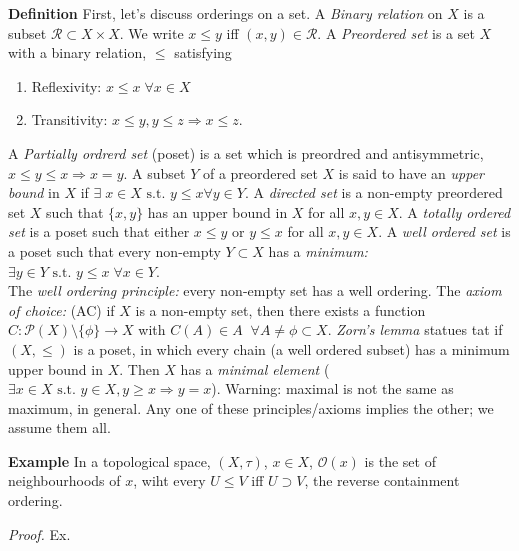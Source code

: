 \documentclass[12pt]{article}
\newcommand{\pset}[1]{ \mathcal{P}(#1) }
\newcommand{\st}[0]{ \textrm{ s.t. } }
\newcommand{\rimply}[0] { \Rightarrow }
\newcommand{\rarw}[0] { \rightarrow }
\newcommand{\curlyO}[0] { \mathcal{O} }
\newcommand{\R}[0] { \mathcal{R} }
\begin{document}
\begin{flushleft} 
  { \bf Definition } First, let's discuss orderings on a set. A \emph{Binary relation} on $X$ is a subset $\R \subset X \times X$. We write $x \le y$ iff $(x,y) \in \R$. A \emph{Preordered set} is a set $X$ with a binary relation, $\le$ satisfying\begin{enumerate}[i]
\item
  Reflexivity: $x \le x \; \forall x \in X$\
\item
  Transitivity: $x \le y, y \le z \rimply x \le z$.
\end{enumerate}
A \emph{Partially ordrerd set} (poset) is a set which is preordred and antisymmetric, $x \le y \le x \rimply x=y$.
A subset $Y$ of a preordered set $X$ is said to have an \emph{upper bound} in $X$ if $\exists \; x \in X \st y \le x \forall y \in Y$.
A \emph{directed set} is a non-empty preordered set $X$ such that $\{x,y\}$ has an upper bound in $X$ for all $x,y \in X$.
A \emph{totally ordered set} is a poset such that either $x \le y$ or $y \le x$ for all $x,y \in X$.
A \emph{well ordered set} is a poset such that every non-empty $Y \subset X$ has a \emph{minimum:} $\exists y \in Y \st y \le x \; \forall x \in Y$. \\


The \emph{well ordering principle:} every non-empty set has a well ordering.
The \emph{axiom of choice:} (AC) if $X$ is a non-empty set, then there exists a function $C: \pset{X} \setminus \{ \phi \} \rarw X$ with $C(A) \in A \; \; \forall A \not = \phi \subset X$.
\emph{Zorn's lemma} statues tat if $(X, \le)$ is a poset, in which every chain (a well ordered subset) has a minimum upper bound in $X$. Then $X$ has a \emph{minimal element} ( $\exists x \in X \st  y \in X, y\ge x \rimply y=x$). Warning: maximal is not the same as maximum, in general. Any one of these principles/axioms implies the other; we assume them all.
\end{flushleft}


\begin{flushleft} {\bf Example} 
In a topological space, $(X, \tau)$, $x \in X$, $\curlyO(x)$ is the set of neighbourhoods of $x$, wiht every $U \le V$ iff $U \supset V$, the reverse containment ordering.
\end{flushleft}

\begin{flushleft}
\emph{Proof.} Ex.
\end{flushleft}
\end{document}
